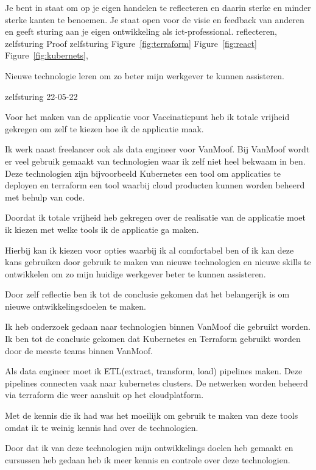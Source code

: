 \competentie
{%
	\competentieformulier
	{%
		Je bent in staat om op je eigen handelen te reflecteren
		en daarin sterke en minder sterke kanten te
		benoemen. Je staat open voor de visie en feedback
		van anderen en geeft sturing aan je eigen ontwikkeling
		als ict-professional.
	}
	{%
		reflecteren,
		zelfsturing
	}
	{%
		Proof
	}
	{%
		zelfsturing
	}
	{%
		Figure~\ref{fig:terraform}
		Figure~\ref{fig:react}
		Figure~\ref{fig:kubernets},
	}
}
{%
	\bewijs
	{
		Nieuwe technologie leren om zo beter mijn werkgever te kunnen assisteren.
	}
	{%
		\starr
		{%
			zelfsturing
		}
		{%
			22-05-22
		}
		{%
			Voor het maken van de applicatie voor Vaccinatiepunt heb ik totale vrijheid gekregen om zelf te kiezen hoe ik de applicatie maak.

			Ik werk naast freelancer ook als data engineer voor VanMoof.
			Bij VanMoof wordt er veel gebruik gemaakt van technologien waar ik zelf niet heel bekwaam in ben.
			Deze technologien zijn bijvoorbeeld Kubernetes een tool om applicaties te deployen en terraform een tool waarbij cloud producten kunnen worden beheerd met behulp van code.
		}
		{%
			Doordat ik totale vrijheid heb gekregen over de realisatie van de applicatie moet ik kiezen met welke tools ik de applicatie ga maken.


			Hierbij kan ik kiezen voor opties waarbij ik al comfortabel ben of ik kan deze kans gebruiken door gebruik te maken van nieuwe technologien en nieuwe skills te ontwikkelen om zo mijn huidige werkgever beter te kunnen assisteren.

			Door zelf reflectie ben ik tot de conclusie gekomen dat het belangerijk is om nieuwe ontwikkelingsdoelen te maken.

		}
		{%
			Ik heb onderzoek gedaan naar technologien binnen VanMoof die gebruikt worden.
			Ik ben tot de conclusie gekomen dat Kubernetes en Terraform gebruikt worden door de meeste teams binnen VanMoof.

			Als data engineer moet ik ETL(extract, transform, load) pipelines maken. Deze pipelines connecten vaak naar kubernetes clusters.
			De netwerken worden beheerd via terraform die weer aansluit op het cloudplatform.

			Met de kennis die ik had was het moeilijk om gebruik te maken van deze tools omdat ik te weinig kennis had over de technologien.

			Door dat ik van deze technologien mijn ontwikkelings doelen heb gemaakt en cursussen heb gedaan heb ik meer kennis en controle over deze technologien.

}}}

